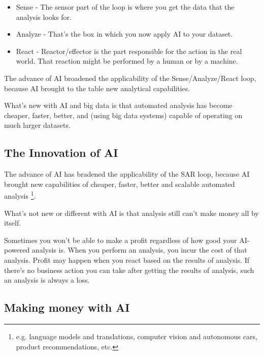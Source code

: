 \begin{itemize}
    \item Sense - The sensor part of the loop is where you get
    the data that the analysis looks for.

    \item Analyze - That's the box in which you now apply AI
    to your dataset.

    \item React - Reactor/effector is the part responsible for
    the action in the real world. That reaction might be
    performed by a human or by a machine.
\end{itemize}

The advance of AI broadened the applicability of the
Sense/Analyze/React loop, because AI brought to the table new
analytical capabilities.

What's new with AI and big data is that automated analysis has
become cheaper, faster, better, and (using big data systems)
capable of operating on much larger datasets.


\subsection{The Innovation of AI}
The advance of AI has bradened the applicability of the SAR loop,
because AI brought new capabilities of cheaper, faster, better and
scalable automated analysis
    \footnote{
        e.g. language models and translations, computer vision and 
        autonomous cars, product recommendations, etc.
    }.

What's not new or different with AI is that analysis still
can't make money all by itself.

Sometimes you won't be able to make a profit regardless of how
good your AI-powered analysis is. When you perform an analysis,
you incur the cost of that analysis. Profit may happen when you
react based on the results of analysis. If there's no business
action you can take after getting the results of analysis, such
an analysis is always a loss.


\subsection{Making money with AI}
